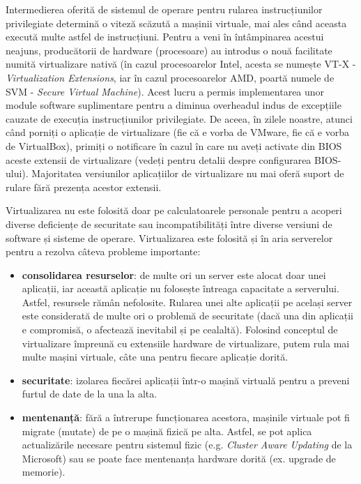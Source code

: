 Intermedierea oferită de sistemul de operare pentru rularea instrucțiunilor privilegiate
determină o viteză scăzută a mașinii virtuale, mai ales când aceasta
execută multe astfel de instrucțiuni. Pentru a veni în întâmpinarea acestui
neajuns, producătorii de hardware (procesoare) au introdus o nouă facilitate
numită virtualizare nativă (în cazul procesoarelor Intel, acesta se numește VT-X
- \textit{Virtualization Extensions}, iar în cazul procesoarelor AMD, poartă numele de SVM
- \textit{Secure Virtual Machine}). Acest lucru a permis implementarea unor module
software suplimentare pentru a diminua overheadul indus de excepțiile cauzate
de execuția instrucțiunilor privilegiate. De aceea, în zilele noastre, atunci
când porniți o aplicație de virtualizare (fie că e vorba de VMware, fie că e
vorba de VirtualBox), primiți o notificare în cazul în care nu aveți activate din BIOS
aceste extensii de virtualizare (vedeți 
pentru detalii despre configurarea BIOS-ului). Majoritatea versiunilor
aplicațiilor de virtualizare nu mai oferă suport de rulare fără prezența acestor
extensii.

Virtualizarea nu este folosită doar pe calculatoarele personale pentru a acoperi
diverse deficiențe de securitate sau incompatibilități între diverse versiuni de
software și sisteme de operare. Virtualizarea este folosită și în aria
serverelor pentru a rezolva câteva probleme importante:

\begin{itemize}
  \item \textbf{consolidarea resurselor}: de multe ori un server este alocat doar
    unei aplicații, iar această aplicație nu folosește întreaga
    capacitate a serverului. Astfel, resursele rămân nefolosite.
    Rularea unei alte aplicații pe același server este considerată
    de multe ori o problemă de securitate (dacă una din aplicații e
    compromisă, o afectează inevitabil și pe cealaltă). Folosind
    conceptul de virtualizare împreună cu extensiile hardware de
    virtualizare, putem rula mai multe mașini virtuale, câte una
    pentru fiecare aplicație dorită.
  \item \textbf{securitate}: izolarea fiecărei aplicații într-o mașină virtuală
    pentru a preveni furtul de date de la una la alta.
  \item \textbf{mentenanță}: fără a întrerupe funcționarea acestora,
    mașinile virtuale pot fi migrate (mutate) de pe o mașină fizică
    pe alta. Astfel, se pot aplica actualizările necesare pentru
    sistemul fizic (e.g. \textit{Cluster Aware Updating} de la
    Microsoft) sau se poate face mentenanța hardware dorită (ex.
    upgrade de memorie).
\end{itemize}

